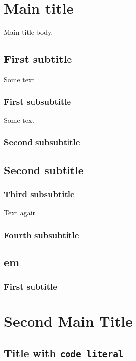 \chapter{Main title}
Main title body.

\section{First subtitle}
Some text

\subsection{First subsubtitle}
Some text


\subsection{Second subsubtitle}



\section{Second subtitle}

\subsection{Third subsubtitle}
Text again


\subsection{Fourth subsubtitle}



\section{em}

\subsection{First subtitle}




\chapter{Second Main Title}

\section{Title with \verb|code literal|}
